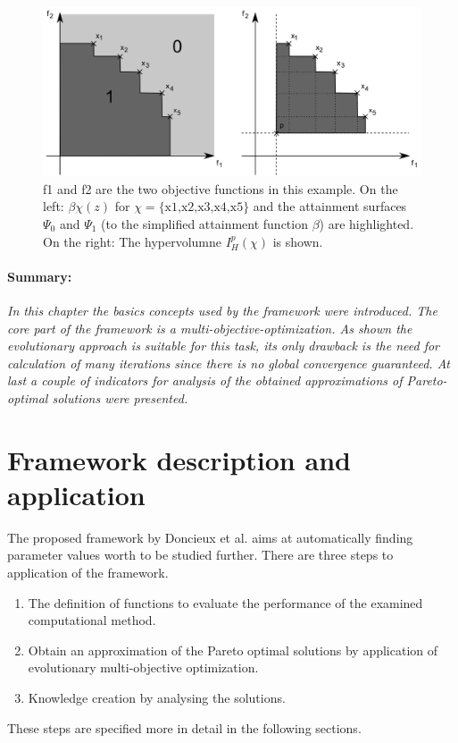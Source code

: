 \documentclass[12pt,twoside]{article}
\theoremstyle{plain}
\theoremstyle{definition}
\theoremstyle{remark}
\begin{document}
 \addtocounter{footnote}{-1}
\begin{figure}[h]
	\begin{center}
		\includegraphics[width=1\textwidth]{Bilder/attainment.png}
	\end{center}
	\caption[f1 and f2 are the two objective functions in this example. On the left: $\beta\chi(z)$ for $\chi = \text{\{x1,x2,x3,x4,x5\}}$ and the attainment surfaces $\Psi_0$ and $\Psi_1$ (to the simplified attainment function $\beta$) are highlighted. On the right: The hypervolumne $I^p_H(\chi)$ is shown.]{f1 and f2 are the two objective functions in this example. On the left: $\beta\chi(z)$ for $\chi = \text{\{x1,x2,x3,x4,x5\}}$ and the attainment surfaces $\Psi_0$ and $\Psi_1$ (to the simplified attainment function $\beta$) are highlighted. On the right: The hypervolumne $I^p_H(\chi)$ is shown. \footnotemark}
	\label{fig:attainment}
\end{figure}
\paragraph{Summary:}
\textit{
	In this chapter the basics concepts used by the framework were introduced.
	The core part of the framework is a multi-objective-optimization. 
	As shown the evolutionary approach is suitable for this task, its only drawback is the need for calculation of many iterations since there is no global convergence guaranteed.
	At last a couple of indicators for analysis of the obtained approximations of Pareto-optimal solutions were presented.
}

\section{Framework description and application}
\label{sec:model}
The proposed framework by Doncieux et al. \cite{doncieux2015multi} aims at automatically finding parameter values worth to be studied further.
There are three steps to application of the framework.
\begin{enumerate}
	\item The definition of functions to evaluate the performance of the examined computational method.
	\item Obtain an approximation of the Pareto optimal solutions by application of evolutionary multi-objective optimization.
	\item Knowledge creation by analysing the solutions.
\end{enumerate}
These steps are specified more in detail in the following sections.
\end{document}

